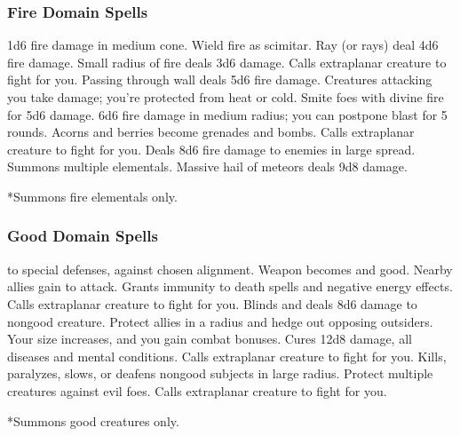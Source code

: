 \subsubsection{Fire Domain Spells}

\begin{spelllist}
     1d6 fire damage in medium cone.
    \spellhead[1]{}
     Wield fire as scimitar.
     Ray (or rays) deal 4d6 fire damage.
    \spellhead[3]{}
     Small radius of fire deals 3d6 damage.
     Calls extraplanar creature to fight for you.
     Passing through wall deals 5d6 fire damage.
     Creatures attacking you take damage; you're protected from heat or cold.
     Smite foes with divine fire for 5d6 damage.
     6d6 fire damage in medium radius; you can postpone blast for 5 rounds.
     Acorns and berries become grenades and bombs.
    \spellhead[7]{}
     Calls extraplanar creature to fight for you.
     Deals 8d6 fire damage to enemies in large spread.
     Summons multiple elementals.
     Massive hail of meteors deals 9d8 damage.
\end{spelllist}
*Summons fire elementals only.

\subsubsection{Good Domain Spells}

\begin{spelllist}
    \spellhead[1]{}
      to special defenses,  against chosen alignment.
     Weapon becomes  and good.
     Nearby allies gain  to attack.
     Grants immunity to death spells and negative energy effects.
     Calls extraplanar creature to fight for you.
    \spellhead[4]{}
     Blinds and deals 8d6 damage to nongood creature.
     Protect allies in a \areamed radius and hedge out opposing outsiders.
     Your size increases, and you gain combat bonuses.
     Cures 12d8 damage, all diseases and mental conditions.
     Calls extraplanar creature to fight for you.
    \F Kills, paralyzes, slows, or deafens nongood subjects in large radius.
    \spellhead[7]{}
    \spellhead[8]{}
     Protect multiple creatures against evil foes. 
    \spellhead[9]{}
     Calls extraplanar creature to fight for you.
\end{spelllist}
*Summons good creatures only.

